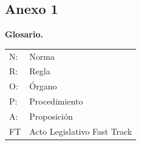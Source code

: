 \documentclass[]{book}
\begin{document}
\begin{refsection}
\nocite{Bulygin1991}
\nocite{Kelsen1995}
\nocite{Kelsen2005}
\nocite{Nino2017}
\nocite{MelinPactet2011}
\nocite{Ross1991}
\nocite{Suber1990}

\printbibliography[heading=subbibliography,title={Referencias}]

\section*{Anexo 1}

\textbf{Glosario.}

\begin{longtable}[]{@{}ll@{}}
\toprule
\midrule
\endhead
N: & Norma\tabularnewline
R: & Regla\tabularnewline
O: & Órgano\tabularnewline
P: & Procedimiento\tabularnewline
A: & Proposición\tabularnewline
FT & Acto Legislativo Fast Track\tabularnewline
\bottomrule
\end{longtable}


\end{refsection}
\end{document}
